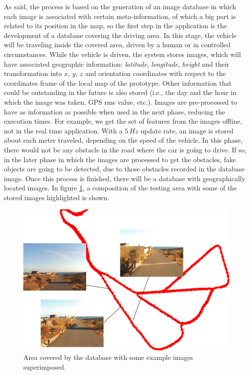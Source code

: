 As said, the process is based on the generation of an image database in which each image is associated with certain meta-information, of which a big part is related to its position in the map, so the first step in the application is the development of a database covering the driving area. In this stage, the vehicle will be traveling inside the covered area, driven by a human or in controlled circumstances. While the vehicle is driven, the system stores images, which will have associated geographic information: \emph{latitude}, \emph{longitude}, \emph{height} and their transformation into $x$, $y$, $z$ and orientation coordinates with respect to the coordinates frame of the local map of the prototype. Other information that could be outstanding in the future is also stored (i.e., the day and the hour in which the image was taken, \ac{GPS} rms value, etc.). Images are pre-processed to have as information as possible when used in the next phase, reducing the execution times. For example, we get the set of features from the images offline, not in the real time application. With a $5\,Hz$ update rate, an image is stored about each meter traveled, depending on the speed of the vehicle. In this phase, there would not be any obstacle in the road where the car is going to drive. If so, in the later phase in which the images are processed to get the obstacles, fake objects are going to be detected, due to those obstacles recorded in the database image. Once this process is finished, there will be a database with geographically located images. In figure \ref{fig:cp02_image_database}, a composition of the testing area with some of the stored images highlighted is shown.

\begin{figure}[thb]
  \centering
  \includegraphics{database}
  \caption{Area covered by the database with some example images superimposed.}
  \label{fig:cp02_image_database}
\end{figure}

